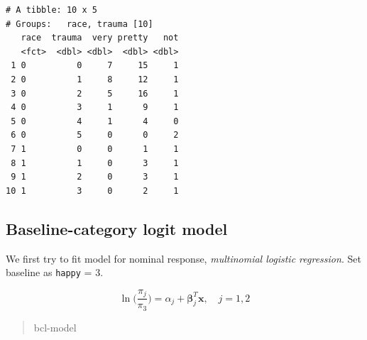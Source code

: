 \documentclass[]{book}
\newenvironment{Shaded}{\begin{snugshade}}{\end{snugshade}}
\newcommand{\CommentTok}[1]{\textcolor[rgb]{0.56,0.35,0.01}{\textit{#1}}}
\newcommand{\DataTypeTok}[1]{\textcolor[rgb]{0.13,0.29,0.53}{#1}}
\newcommand{\DecValTok}[1]{\textcolor[rgb]{0.00,0.00,0.81}{#1}}
\newcommand{\KeywordTok}[1]{\textcolor[rgb]{0.13,0.29,0.53}{\textbf{#1}}}
\newcommand{\NormalTok}[1]{#1}
\newcommand{\OperatorTok}[1]{\textcolor[rgb]{0.81,0.36,0.00}{\textbf{#1}}}
\newcommand{\StringTok}[1]{\textcolor[rgb]{0.31,0.60,0.02}{#1}}
\begin{document}
\begin{Shaded}
\end{Shaded}

\begin{verbatim}
# A tibble: 10 x 5
# Groups:   race, trauma [10]
   race  trauma  very pretty   not
   <fct>  <dbl> <dbl>  <dbl> <dbl>
 1 0          0     7     15     1
 2 0          1     8     12     1
 3 0          2     5     16     1
 4 0          3     1      9     1
 5 0          4     1      4     0
 6 0          5     0      0     2
 7 1          0     0      1     1
 8 1          1     0      3     1
 9 1          2     0      3     1
10 1          3     0      2     1
\end{verbatim}

\hypertarget{baseline-category-logit-model}{%
\subsection{Baseline-category logit model}\label{baseline-category-logit-model}}

We first try to fit model for nominal response, \emph{multinomial logistic regression}. Set baseline as \texttt{happy} = 3.

\[\ln\bigg(\frac{\pi_j}{\pi_3}\bigg) = \alpha_j + \boldsymbol\beta_j^T\mathbf{x}, \quad j = 1, 2\]

\begin{quote}
bcl-model
\end{quote}

\begin{Shaded}
\end{Shaded}
\end{document}
